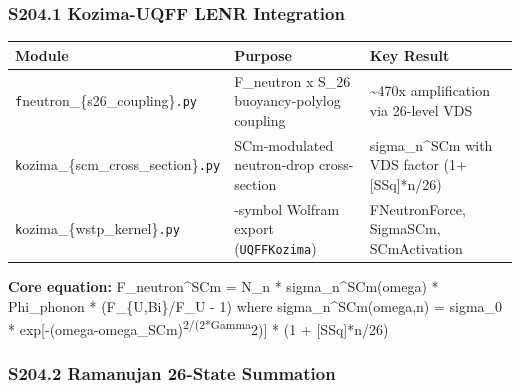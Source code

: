 \subsubsection{S204.1 Kozima-UQFF LENR
Integration}\label{s204.1-kozima-uqff-lenr-integration}

{\def\LTcaptype{none} %
\begin{longtable}[]{@{}
  >{\raggedright\arraybackslash}p{}
  >{\raggedright\arraybackslash}p{}
  >{\raggedright\arraybackslash}p{}@{}}
\toprule\noalign{}
\begin{minipage}[b]{\linewidth}\raggedright
Module
\end{minipage} & \begin{minipage}[b]{\linewidth}\raggedright
Purpose
\end{minipage} & \begin{minipage}[b]{\linewidth}\raggedright
Key Result
\end{minipage} \\
\midrule\noalign{}
\endhead
\bottomrule\noalign{}
\endlastfoot
\texttt{f}neutron\_\{s26\_coupling\}\texttt{.py} & F\_neutron x S\_26
buoyancy-polylog coupling & \textasciitilde470x amplification via
26-level VDS \\
\texttt{k}ozima\_\{scm\_cross\_section\}\texttt{.py} & SCm-modulated
neutron-drop cross-section & sigma\_n\^{}SCm with VDS factor
(1+{[}SSq{]}*n/26) \\
\texttt{k}ozima\_\{wstp\_kernel\}\texttt{.py} & 11-symbol Wolfram export
(\texttt{UQFFKozima}) & FNeutronForce, SigmaSCm, SCmActivation \\
\end{longtable}
}

\textbf{Core equation:} F\_neutron\^{}SCm = N\_n *
sigma\_n\^{}SCm(omega) * Phi\_phonon * (F\_\{U,Bi\}/F\_U - 1) where
sigma\_n\^{}SCm(omega,n) = sigma\_0 *
exp{[}-(omega-omega\_SCm)\textsuperscript{2/(2*Gamma}2){]} * (1 +
{[}SSq{]}*n/26)

\subsubsection{S204.2 Ramanujan 26-State
Summation}\label{s204.2-ramanujan-26-state-summation}

